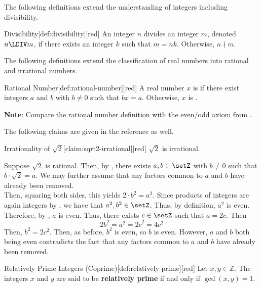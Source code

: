 The following definitions extend the understanding of integers including divisibility.

\begin{define}{Divisibility}[def:divisibility][red]
  An integer $n$ divides an integer $m$, denoted $n \LDIV m$, if there 
  exists an integer $k$ such that $m=n k$. Otherwise, $n \nmid m$.
\end{define}

The following definitions extend the classification of real numbers into rational and irrational numbers.

\begin{define}{Rational Number}[def:rational-number][red]
  A real number $x$ is  if there exist integers $a$ and $b$ with $b \neq 0$ such that $bx = a$.
  Otherwise, $x$ is .

  \textbf{Note}: Compare the rational number definition with the even/odd axiom  from .
\end{define}

The following claims are given in the reference as well.

\begin{define}{Irrationality of $\sqrt{2}$}[claim:sqrt2-irrational][red]
  $\sqrt{2}$ is irrational.
  \begin{subprove}[red]
    Suppose $\sqrt{2}$ is rational. Then, by , there exists $a,b\in \setZ$ 
    with $b\ne 0$ such that $b\cdot\sqrt{2}=a$. We may further assume that any factors 
    common to $a$ and $b$ have already been removed.\\

    Then, squaring both sides, this yields $2\cdot b^2 = a^2$.
    Since products of integers are again integers by , we have that $a^2,b^2\in \setZ$.
    Thus, by definition, $a^2$ is even. Therefore, by , $a$ is even. 
    Thus, there exists $c\in\setZ$ such that $a=2c$. Then
    $$
    2b^2=a^2={2c}^2=4c^2
    $$
    Then, $b^2=2c^2$. Then, as before, $b^2$ is even, so $b$ is even.
    However, $a$ and $b$ both being even contradicts the fact that any factors 
    common to $a$ and $b$ have already been removed.
  \end{subprove}
\end{define}






\begin{define}{Relatively Prime Integers (Coprime)}[def:relatively-prime][red]
  Let $x,y \in \mathbb{Z}$. The integers $x$ and $y$ are said to be
  \textbf{relatively prime} if and only if
  $\gcd(x,y) = 1$.
\end{define}